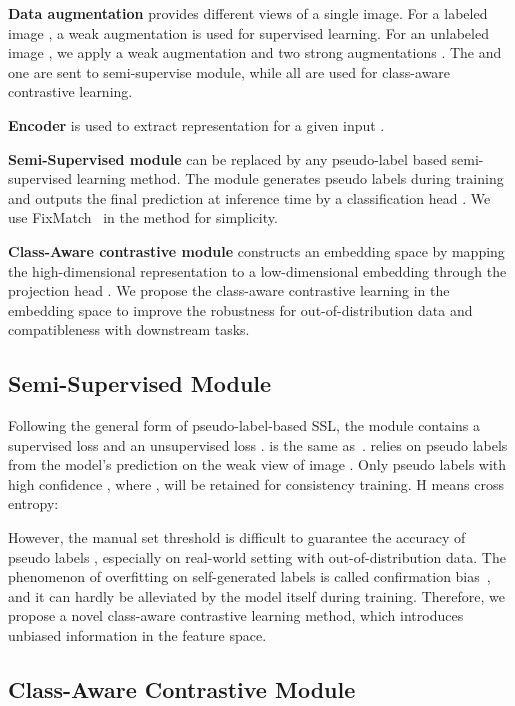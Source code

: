 \documentclass[10pt,twocolumn,letterpaper]{article}
\begin{document}
\textbf{Data augmentation} provides different views of a single image. For a labeled image , a weak augmentation is used for supervised learning. For an unlabeled image , we apply a weak augmentation  and two strong augmentations . The  and one  are sent to semi-supervise module, while all  are used for class-aware contrastive learning.
        
\textbf{Encoder}  is used to extract representation  for a given input .


\textbf{Semi-Supervised module} can be replaced by any pseudo-label based semi-supervised learning method. The module generates pseudo labels during training and outputs the final prediction at inference time by a classification head . We use FixMatch~\cite{sohn2020fixmatch} in the method for simplicity.
    
\textbf{Class-Aware contrastive module} constructs an embedding space by mapping the high-dimensional representation  to a low-dimensional embedding  through the 
    projection head . We propose the class-aware contrastive learning in the embedding space to improve the robustness for out-of-distribution data and compatibleness with downstream tasks. 
    
\subsection{Semi-Supervised Module} \label{method:semi-sup-module}
Following the general form of pseudo-label-based SSL, the module contains a supervised loss  and an unsupervised loss .  is the same as~\cite{sohn2020fixmatch}.   relies on pseudo labels  from the model's prediction  on the weak view of image . Only pseudo labels with high confidence , where , will be retained for consistency training. H means cross entropy:



However, the manual set threshold  is difficult to guarantee the accuracy of pseudo labels , especially on real-world setting with out-of-distribution data. The phenomenon of overfitting on self-generated labels is called confirmation bias~\cite{arazo2020pseudo}, and it can hardly be alleviated by the model itself during training. Therefore, we propose a novel class-aware contrastive learning method, which introduces unbiased information in the feature space. 

\subsection{Class-Aware Contrastive Module} \label{method:ClassAwareContrastive}
\end{document}
